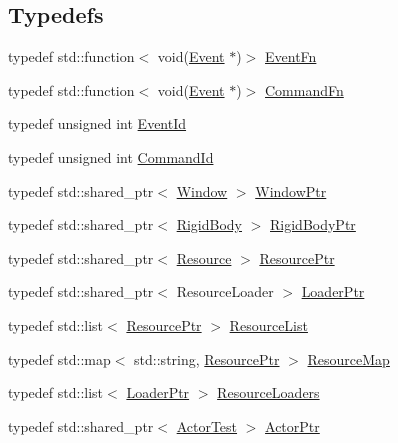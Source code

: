 \subsection*{Typedefs}
\begin{DoxyCompactItemize}
\item 
typedef std\+::function$<$ void(\hyperlink{structTarbora_1_1Event}{Event} $\ast$)$>$ \hyperlink{namespaceTarbora_a418b0f026f0664511b2a0c4129edc11f}{Event\+Fn}
\item 
typedef std\+::function$<$ void(\hyperlink{structTarbora_1_1Event}{Event} $\ast$)$>$ \hyperlink{namespaceTarbora_a20140292404b48531b04defa2af01724}{Command\+Fn}
\item 
typedef unsigned int \hyperlink{namespaceTarbora_a5373bb1f8a65622379828cdefc8d42e5}{Event\+Id}
\item 
typedef unsigned int \hyperlink{namespaceTarbora_a80dd00c7124f78a02d3d899eb0edbd29}{Command\+Id}
\item 
typedef std\+::shared\+\_\+ptr$<$ \hyperlink{classTarbora_1_1Window}{Window} $>$ \hyperlink{namespaceTarbora_a39d9bc5a791c73dc51bee4255997ac12}{Window\+Ptr}
\item 
typedef std\+::shared\+\_\+ptr$<$ \hyperlink{classTarbora_1_1RigidBody}{Rigid\+Body} $>$ \hyperlink{namespaceTarbora_a425b010b7a1b745d6fa83cc80f7f15b6}{Rigid\+Body\+Ptr}
\item 
typedef std\+::shared\+\_\+ptr$<$ \hyperlink{classTarbora_1_1Resource}{Resource} $>$ \hyperlink{namespaceTarbora_ae7879d11814e081a1e13e25a669c9164}{Resource\+Ptr}
\item 
typedef std\+::shared\+\_\+ptr$<$ Resource\+Loader $>$ \hyperlink{namespaceTarbora_a9778d3976ea45923cf1d59f95972ce7f}{Loader\+Ptr}
\item 
typedef std\+::list$<$ \hyperlink{namespaceTarbora_ae7879d11814e081a1e13e25a669c9164}{Resource\+Ptr} $>$ \hyperlink{namespaceTarbora_a5cddf1696a474301ef4d142bb262c30f}{Resource\+List}
\item 
typedef std\+::map$<$ std\+::string, \hyperlink{namespaceTarbora_ae7879d11814e081a1e13e25a669c9164}{Resource\+Ptr} $>$ \hyperlink{namespaceTarbora_a840dcdda25851314adc29ccdc06e5ec9}{Resource\+Map}
\item 
typedef std\+::list$<$ \hyperlink{namespaceTarbora_a9778d3976ea45923cf1d59f95972ce7f}{Loader\+Ptr} $>$ \hyperlink{namespaceTarbora_adcb77cac4f2f18382b073dd119314450}{Resource\+Loaders}
\item 
typedef std\+::shared\+\_\+ptr$<$ \hyperlink{classTarbora_1_1ActorTest}{Actor\+Test} $>$ \hyperlink{namespaceTarbora_a9931980f07865b0ab6094efe8a2edac1}{Actor\+Ptr}

\end{DoxyCompactItemize}
